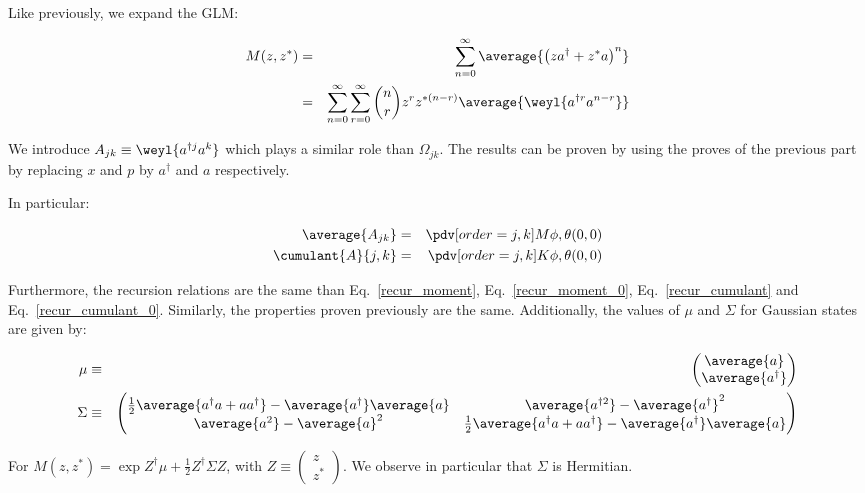 Like previously, we expand the GLM:

\begin{eqnarray}
    M(z, z^*) &=& \sum_{n = 0}^\infty \average{\left(z a^\dagger + z^* a\right)^n} \nonumber\\
    &=& \sum_{n = 0}^\infty \sum_{r=0}^\infty \binom{n}{r} z^r z^{* (n-r)} \average{\weyl{a^{\dagger r} a^{n-r}}}
\end{eqnarray}

We introduce $A_{j k} \equiv \weyl{a^{\dagger j} a^{k}}$ which plays a similar role than $\Omega_{j k}$. The results can be proven by using the proves of the previous part by replacing $x$ and $p$ by $a^\dagger$ and $a$ respectively.

In particular:

\begin{eqnarray}
    \average{A_{j k}} &=& \pdv[order = {j,k}]{M}{\phi,\theta}(0, 0)\\
    \cumulant{A}{{j, k}} &=& \pdv[order = {j,k}]{K}{\phi,\theta}(0, 0)
\end{eqnarray}

Furthermore, the recursion relations are the same than Eq.~\ref{recur_moment}, Eq.~\ref{recur_moment_0}, Eq.~\ref{recur_cumulant} and Eq.~\ref{recur_cumulant_0}. Similarly, the properties proven previously are the same. Additionally, the values of $\mu$ and $\Sigma$ for Gaussian states are given by:

\begin{eqnarray}
    \mu &\equiv& \begin{pmatrix}
        \average{a}\\
        \average{a^\dagger}
    \end{pmatrix}\\
    \Sigma &\equiv& \begin{pmatrix}
    \frac{1}{2} \average{a^\dagger a + a a^\dagger} - \average{a^\dagger} \average{a} & \average{a^{\dagger 2}} - \average{a^\dagger}^2\\
    \average{a^{ 2}} - \average{a}^2 & \frac{1}{2} \average{a^\dagger a + a a^\dagger} - \average{a^\dagger} \average{a}
    \end{pmatrix}
\end{eqnarray}

For $M(z, z^*) = \exp{Z^\dagger \mu + \frac{1}{2} Z^\dagger \Sigma Z}$, with $Z \equiv \begin{pmatrix}
        z\\
        z^*
    \end{pmatrix}$. We observe in particular that $\Sigma$ is Hermitian.

